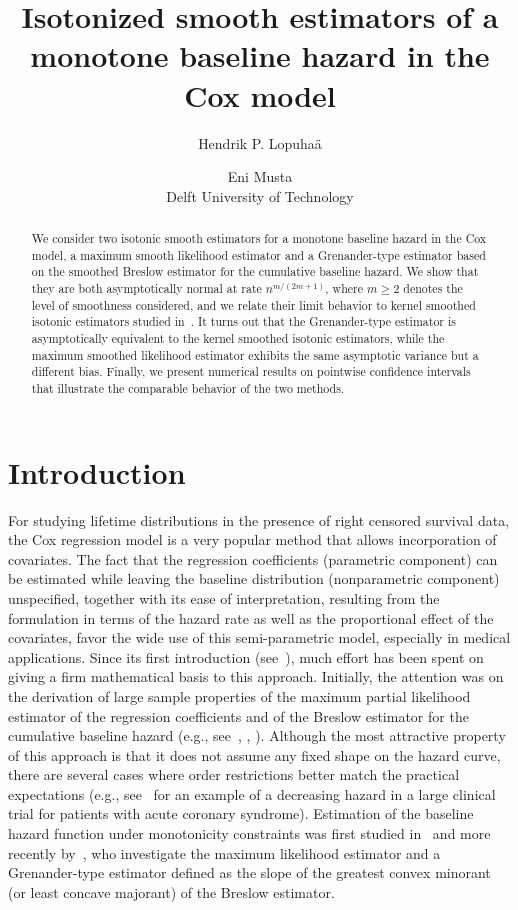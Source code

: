 \documentclass[11pt,reqno]{amsart}
\title[Isotonized smooth estimators of a monotone hazard in the Cox model]{Isotonized smooth estimators of a monotone baseline hazard in the Cox model}
\author[Hendrik P. Lopuha\"a and Eni Musta]{Hendrik P. Lopuha\"a \and Eni Musta \\ Delft University of Technology}
\theoremstyle{definition}
\theoremstyle{plain}
\theoremstyle{remark}
\begin{document}
\begin{abstract}
We consider two isotonic smooth estimators for a monotone baseline hazard in the Cox model,
a maximum smooth likelihood estimator and a Grenander-type estimator based on the smoothed Breslow estimator for the
cumulative baseline hazard.
We show that they are both asymptotically normal at rate $n^{m/(2m+1)}$, where $m\geq 2$ denotes the level of smoothness considered,
and we relate their limit behavior to kernel smoothed isotonic estimators studied in~\cite{LopuhaaMustaSI2016}.
It turns out that the Grenander-type estimator is asymptotically equivalent to the kernel smoothed isotonic estimators,
while the maximum smoothed likelihood estimator exhibits the same asymptotic variance but a different bias.
Finally, we present numerical results on pointwise confidence intervals that illustrate the comparable behavior of the two methods.
\end{abstract}

\maketitle

\section{Introduction}
For studying lifetime distributions in the presence of right censored survival data,
the Cox regression model is a very popular method that allows incorporation of covariates.
The fact that the regression coefficients (parametric component) can be estimated while leaving the baseline distribution (nonparametric component) unspecified,
together with its ease of interpretation, resulting from the formulation in terms of the hazard rate as well as the proportional effect of the covariates,
favor the wide use of this semi-parametric model, especially in medical applications.
Since its first introduction (see~\cite{Cox72}), much effort has been spent on giving a firm mathematical basis to this approach.
Initially, the attention was on the derivation of large sample properties of the maximum partial likelihood estimator of the regression coefficients and of the Breslow estimator for the cumulative baseline hazard (e.g., see~\cite{Efron72}, \cite{Cox75}, \cite{Tsiatis81}).
Although the most attractive property of this approach is that it does not assume any fixed shape on the hazard curve, there are several cases
where order restrictions better match the practical expectations
(e.g., see~\cite{Geloven13} for an example of a decreasing hazard in a large clinical trial for patients with acute coronary syndrome).
Estimation of the baseline hazard function under monotonicity constraints was first studied in~\cite{CC94} and
more recently by~\cite{LopuhaaNane2013}, who investigate the maximum likelihood estimator and a Grenander-type estimator
defined as the slope of the greatest convex minorant (or least concave majorant) of the Breslow estimator.
\end{document}

